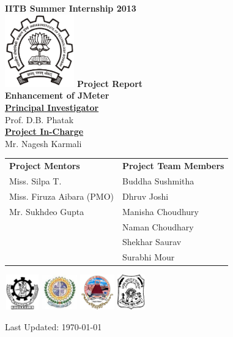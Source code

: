 \documentclass[12pt]{book}
\begin{document}
\begin{titlepage}
 \begin{center}
\Huge
\textbf{IITB Summer Internship 2013} \\
\vfill
\includegraphics[width=3cm]{images/logos/IITB_logo.png}
\vfill
\Huge
\textbf{Project Report}\\
\vfill
\textbf{Enhancement of JMeter}\\
\vfill
\LARGE
\underline{\textbf{Principal Investigator}} \\
Prof. D.B. Phatak\\
\vfill
\LARGE
\underline{\textbf{Project In-Charge}} \\
Mr. Nagesh Karmali\\
\vfill
\Large

\begin{tabular}{l|l}
\textbf{Project Mentors} & \textbf{Project Team Members} \\
Miss. Silpa T. & Buddha Sushmitha \\
Miss. Firuza Aibara (PMO) & Dhruv Joshi \\ 
Mr. Sukhdeo Gupta &  Manisha Choudhury \\
 & Naman Choudhary  \\
 & Shekhar Saurav \\
 & Surabhi Mour \\
\end{tabular}
\vfill
\includegraphics[width=1.5cm, height=1.5cm]{images/logos/nitr_logo} \hfill
\includegraphics[width=1.5cm, height=1.5cm]{images/logos/nitsurat_logo} \hfill
\includegraphics[width=1.5cm, height=1.5cm]{images/logos/kiet_logo} \hfill
\includegraphics[width=1.2cm, height=1.5cm]{images/logos/nitjsr_logo} \hfill

\vfill
Last Updated: \today
\end{center}
\end{titlepage}
\end{document}
